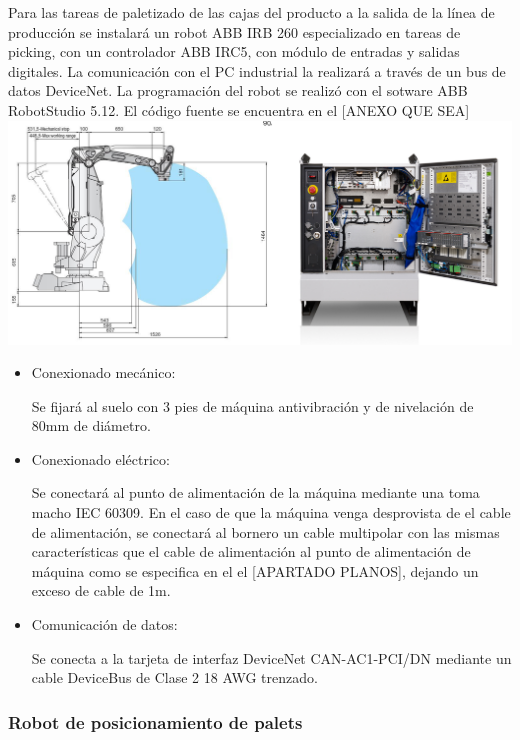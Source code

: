 	Para las tareas de paletizado de las cajas del producto a la salida de la línea de producción se instalará un robot ABB IRB 260 especializado en tareas de picking, con un controlador ABB IRC5, con módulo de entradas y salidas digitales. La comunicación con el PC industrial la realizará a través de un bus de datos DeviceNet. La programación del robot se realizó con el sotware ABB RobotStudio 5.12. El código fuente se encuentra en el [ANEXO QUE SEA]\\
	\includegraphics[scale=0.3]{Datasheets/8Foto.jpg}
		\begin{itemize}
				\item{Conexionado mecánico:}
				
				Se fijará al suelo con 3 pies de máquina antivibración y de nivelación de 80mm de diámetro.

				\item{Conexionado eléctrico:}

				Se conectará al punto de alimentación de la máquina mediante una  toma macho IEC 60309. En el caso de que la máquina venga desprovista de el cable de alimentación, se conectará al bornero un cable multipolar con las mismas características que el cable de alimentación al punto de alimentación de máquina como se especifica en el el [APARTADO PLANOS], dejando un exceso de cable de 1m. \	
							
				\item{Comunicación de datos:}

				Se conecta a la tarjeta de interfaz DeviceNet CAN-AC1-PCI/DN mediante un cable DeviceBus de Clase 2 18 AWG trenzado.
		\end{itemize}
\newpage

	\subsubsection{Robot de posicionamiento de palets}

	
	
